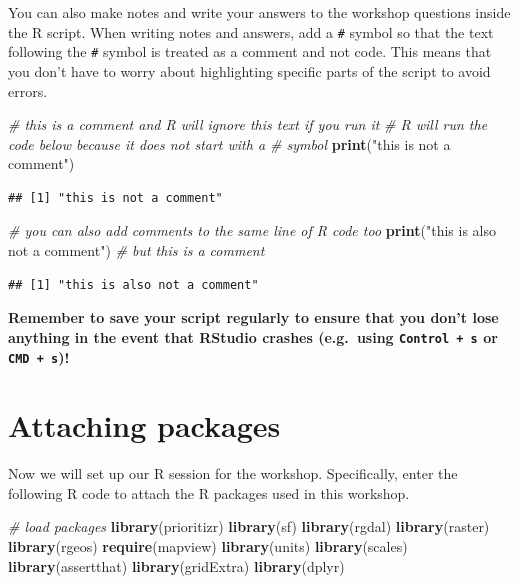 \documentclass[12pt,]{book}
\newenvironment{Shaded}{\begin{snugshade}}{\end{snugshade}}
\newcommand{\KeywordTok}[1]{\textcolor[rgb]{0.13,0.29,0.53}{\textbf{#1}}}
\newcommand{\StringTok}[1]{\textcolor[rgb]{0.31,0.60,0.02}{#1}}
\newcommand{\CommentTok}[1]{\textcolor[rgb]{0.56,0.35,0.01}{\textit{#1}}}
\newcommand{\NormalTok}[1]{#1}
\begin{document}
You can also make notes and write your answers to the workshop questions
inside the R script. When writing notes and answers, add a \texttt{\#}
symbol so that the text following the \texttt{\#} symbol is treated as a
comment and not code. This means that you don't have to worry about
highlighting specific parts of the script to avoid errors.

\begin{Shaded}
\begin{Highlighting}[]
\CommentTok{# this is a comment and R will ignore this text if you run it}
\CommentTok{# R will run the code below because it does not start with a # symbol}
\KeywordTok{print}\NormalTok{(}\StringTok{"this is not a comment"}\NormalTok{)}
\end{Highlighting}
\end{Shaded}

\begin{verbatim}
## [1] "this is not a comment"
\end{verbatim}

\begin{Shaded}
\begin{Highlighting}[]
\CommentTok{# you can also add comments to the same line of R code too}
\KeywordTok{print}\NormalTok{(}\StringTok{"this is also not a comment"}\NormalTok{) }\CommentTok{# but this is a comment}
\end{Highlighting}
\end{Shaded}

\begin{verbatim}
## [1] "this is also not a comment"
\end{verbatim}

\textbf{Remember to save your script regularly to ensure that you don't
lose anything in the event that RStudio crashes (e.g.~using
\texttt{Control\ +\ s} or \texttt{CMD\ +\ s})!}

\section{Attaching packages}\label{attaching-packages}

Now we will set up our R session for the workshop. Specifically, enter
the following R code to attach the R packages used in this workshop.

\begin{Shaded}
\begin{Highlighting}[]
\CommentTok{# load packages}
\KeywordTok{library}\NormalTok{(prioritizr)}
\KeywordTok{library}\NormalTok{(sf)}
\KeywordTok{library}\NormalTok{(rgdal)}
\KeywordTok{library}\NormalTok{(raster)}
\KeywordTok{library}\NormalTok{(rgeos)}
\KeywordTok{require}\NormalTok{(mapview)}
\KeywordTok{library}\NormalTok{(units)}
\KeywordTok{library}\NormalTok{(scales)}
\KeywordTok{library}\NormalTok{(assertthat)}
\KeywordTok{library}\NormalTok{(gridExtra)}
\KeywordTok{library}\NormalTok{(dplyr)}
\end{Highlighting}
\end{Shaded}
\end{document}
